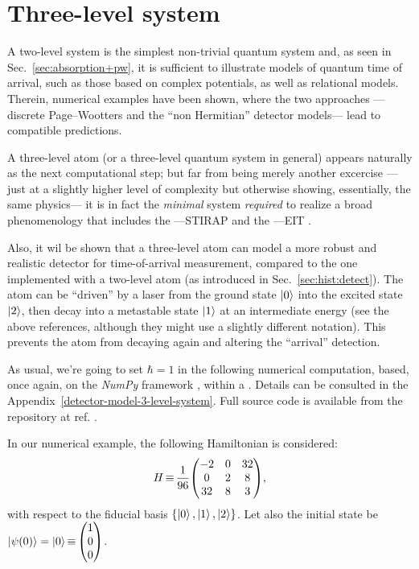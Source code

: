 \section{Three-level system}\label{sec:pw3l}

A two-level system is the simplest non-trivial quantum system and,
as seen in Sec.~\ref{sec:absorption+pw},
it is sufficient to illustrate
models of quantum time of arrival,
such as those based on complex potentials,
as well as relational models.
Therein, numerical examples have been shown, where the two approaches
---discrete Page--Wootters and the ``non Hermitian'' detector models---
lead to
compatible predictions.

A three-level atom (or a three-level quantum system in general) appears
naturally
as
the next computational step;
but far from being merely another excercise
---just at a slightly higher level of complexity
but otherwise showing, essentially, the same physics---
it is in fact the \emph{minimal} system \emph{required}
to realize a broad
phenomenology that includes the
---STIRAP \parencite{Ruschhaupt_AtomDiode, NonHermitianShortcutSTIRAP, OptimizedTransferSTIRAP, Ruschhaupt_STA23}
and the
---EIT \parencite{EIT_Review}.

Also, it wil be shown that a three-level atom can model
a more robust and realistic
detector for time-of-arrival measurement, compared to the one implemented
with a two-level atom (as introduced in Sec.~\ref{sec:hist:detect}).
The atom can be ``driven'' by a laser
from the ground state $\ket{0}$ into the excited state $\ket{2}$,
then decay into a metastable state $\ket{1}$ at an intermediate energy
(see the above references, although they might use a slightly different notation).
This prevents the atom from decaying again and altering the ``arrival'' detection.

As usual, we're going to set $\hbar = 1$ in the following numerical computation,
based, once again, on the
\emph{NumPy} framework \parencite{comp:numpy},
within a
 \parencite{comp:jupyter}.
Details can be consulted in the Appendix~\ref{detector-model-3-level-system}.
Full source code is available from the repository at ref. \cite{OwnJupyterRepo}.

In our numerical example, the following
Hamiltonian is considered:
\begin{equation}
  H \repr \frac{1}{96} \mqty(
    -2  & 0 & 32  \\
     0  & 2 & 8   \\
    32  & 8 & 3
  )
  \text{,}
\end{equation}
with respect to the fiducial basis $\qty{\ket{0}, \ket{1}, \ket{2}}$.
Let also
the initial state be $\ket{\psi(0)} = \ket{0} \repr \mqty(1 \\ 0 \\ 0)$.

